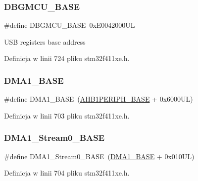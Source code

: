 \subsubsection{\texorpdfstring{D\+B\+G\+M\+C\+U\+\_\+\+B\+A\+SE}{DBGMCU\_BASE}}
{\footnotesize\ttfamily \#define D\+B\+G\+M\+C\+U\+\_\+\+B\+A\+SE~0x\+E0042000\+UL}

U\+SB registers base address 

Definicja w linii 724 pliku stm32f411xe.\+h.

\mbox{\label{group___peripheral__memory__map_gab2d8a917a0e4ea99a22ac6ebf279bc72}} 
\subsubsection{\texorpdfstring{D\+M\+A1\+\_\+\+B\+A\+SE}{DMA1\_BASE}}
{\footnotesize\ttfamily \#define D\+M\+A1\+\_\+\+B\+A\+SE~(\hyperlink{group___peripheral__memory__map_ga811a9a4ca17f0a50354a9169541d56c4}{A\+H\+B1\+P\+E\+R\+I\+P\+H\+\_\+\+B\+A\+SE} + 0x6000\+U\+L)}



Definicja w linii 703 pliku stm32f411xe.\+h.

\mbox{\label{group___peripheral__memory__map_ga0d3c52aa35dcc68f78b704dfde57ba95}} 
\subsubsection{\texorpdfstring{D\+M\+A1\+\_\+\+Stream0\+\_\+\+B\+A\+SE}{DMA1\_Stream0\_BASE}}
{\footnotesize\ttfamily \#define D\+M\+A1\+\_\+\+Stream0\+\_\+\+B\+A\+SE~(\hyperlink{group___peripheral__memory__map_gab2d8a917a0e4ea99a22ac6ebf279bc72}{D\+M\+A1\+\_\+\+B\+A\+SE} + 0x010\+U\+L)}



Definicja w linii 704 pliku stm32f411xe.\+h.

